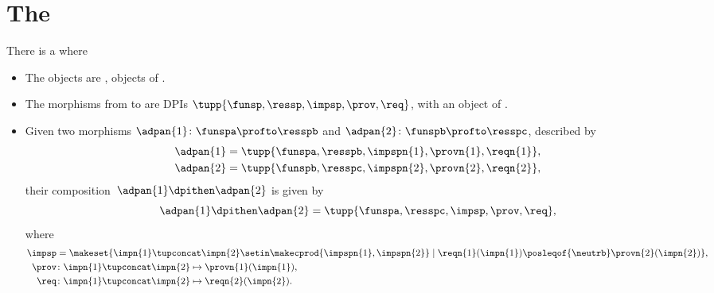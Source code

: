 \section{The  \DPI}
\label{sec:DPI-semicat}


\begin{definition}
    \label{def:DPIcat}
    There is a  \DPI where
    \begin{itemize}
        \item The objects are , objects of \PosL.
        \item The morphisms from \funsp to \ressp are DPIs $\tupp{\funsp,\ressp,\impsp,\prov,\req}$, with \impsp an object of \SetL.
        \item\label{def:dpi-series}
              Given two morphisms
              $\adpan{1} \colon \funspa \profto \resspb$ and
              $\adpan{2} \colon \funspb \profto \resspc$,
              described by
              \begin{align}
                  \adpan{1} & = \tupp{\funspa,\resspb,\impspn{1},\provn{1},\reqn{1}}, \\
                  \adpan{2} & = \tupp{\funspb,\resspc,\impspn{2},\provn{2},\reqn{2}},
              \end{align}
              their composition~$\adpan{1} \dpithen \adpan{2}$ is given by
              \begin{equation}
                  \adpan{1} \dpithen \adpan{2} = \tupp{\funspa,\resspc,\impsp,\prov,\req},
              \end{equation}
              where
              \begin{align}
                  \impsp & = \makeset{ \impn{1} \tupconcat \impn{2} \setin \makecprod{\impspn{1}, \impspn{2}} \mid \reqn{1}(\impn{1}) \posleqof{\neutrb} \provn{2}(\impn{2})}, \\
                  \prov  & \colon \impn{1} \tupconcat \impn{2} \mapsto \provn{1}(\impn{1}), \\
                  \req   & \colon \impn{1} \tupconcat \impn{2} \mapsto \reqn{2}(\impn{2}).
              \end{align}
    \end{itemize}
\end{definition}

